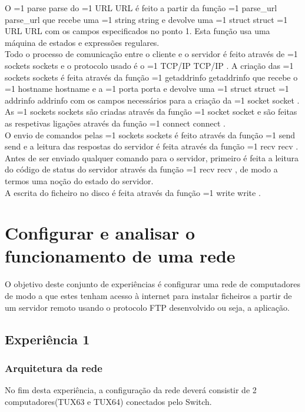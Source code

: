 \documentclass[11pt,a4paper,twocolumn]{article}
\newcommand{\hl}[2][1]{%
  \ifnum#1=1\relax
    \textcolor{text-hl1}{#2}%
  \else
    \textcolor{text-hl2}{#2}%
  \fi
}
\begin{document}
O \hl{parse} do \hl{URL} é feito a partir da função \hl[2]{parse\_url} que recebe uma \hl[2]{string} e devolve uma \hl[2]{struct} \hl{URL} com os campos especificados no ponto 1. Esta função usa uma máquina de estados e expressões regulares. \\
Todo o processo de comunicação entre o cliente e o servidor é feito através de \hl{sockets} e o protocolo usado é o \hl{TCP/IP}. A criação das \hl{sockets} é feita através da função \hl[2]{getaddrinfo} que recebe o \hl[2]{hostname} e a \hl[2]{porta} e devolve uma \hl[2]{struct} \hl{addrinfo} com os campos necessários para a criação da \hl{socket}. \\
As \hl[2]{sockets} são criadas através da função \hl{socket} e são feitas as respetivas ligações através da função \hl[2]{connect}. \\  
O envio de comandos pelas \hl[2]{sockets} é feito através da função \hl[2]{send} e a leitura das respostas do servidor é feita através da função \hl[2]{recv}. \\
Antes de ser enviado qualquer comando para o servidor, primeiro é feita a leitura do código de status do servidor através da função \hl[2]{recv}, de modo a termos uma noção do estado do servidor. \\
A escrita do ficheiro no disco é feita através da função \hl[2]{write}. \\

\section{Configurar e analisar o funcionamento de uma rede}

O objetivo deste conjunto de experiências é configurar uma rede de computadores de modo a que estes tenham acesso à internet para instalar ficheiros a partir de um servidor remoto usando o protocolo FTP desenvolvido ou seja, a aplicação.

\subsection{Experiência 1}

\subsubsection{Arquitetura da rede}
    
No fim desta experiência, a configuração da rede deverá consistir de 2 computadores(TUX63 e TUX64) conectados pelo Switch.
\end{document}
